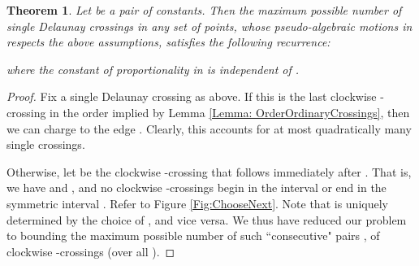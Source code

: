 \documentclass[letter,11pt]{article}
\newtheorem{theorem}{Theorem}[section]
\begin{document}
\begin{theorem}\label{Thm:OrdinaryCrossings}
Let  be a pair of constants. Then the maximum possible number  of single Delaunay crossings in any set  of  points, whose pseudo-algebraic motions in  respects the above assumptions, satisfies the following recurrence:

where the constant of proportionality in  is independent of .
\end{theorem}
\begin{proof}Fix a single Delaunay crossing  as above. If this is the last clockwise -crossing in the order implied by Lemma \ref{Lemma: OrderOrdinaryCrossings}, then we can charge  to the edge . Clearly, this accounts for at most quadratically many single crossings. 

Otherwise, let  be the clockwise -crossing that follows immediately after . That is, we have  and , and no clockwise -crossings begin in the interval  or end in the symmetric interval . Refer to Figure \ref{Fig:ChooseNext}.
Note that  is uniquely determined by the choice of , and vice versa.
We thus have reduced our problem to bounding the maximum possible number of such ``consecutive" pairs ,   of clockwise -crossings (over all ). 











\end{proof}
\end{document}
